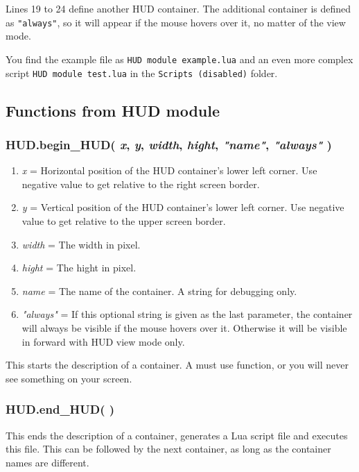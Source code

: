 \documentclass[11pt,parskip=half,a4paper]{scrartcl}
\begin{document}
Lines 19 to 24 define another HUD container. The additional container is defined as \verb|"always"|, so it will appear if the mouse hovers over it, no matter of the view mode.

You find the example file as \verb|HUD module example.lua| and an even more complex script \verb|HUD module test.lua| in the \verb|Scripts (disabled)| folder.

\subsection{Functions from HUD module}

\subsubsection{HUD.begin\_HUD( \emph{x}, \emph{y}, \emph{width}, \emph{hight}, \emph{"name"}, \emph{"always"} )}

\begin{enumerate}
	\item \emph{x} = Horizontal position of the HUD container's lower left corner. Use negative value to get relative to the right screen border.
	\item \emph{y} = Vertical position of the HUD container's lower left corner. Use negative value to get relative to the upper screen border.
	\item \emph{width} = The width in pixel.
	\item \emph{hight} = The hight in pixel.
	\item \emph{name} = The name of the container. A string for debugging only.
	\item \emph{"always"} = If this optional string is given as the last parameter, the container will always be visible if the mouse hovers over it. Otherwise it will be visible in forward with HUD view mode only.
\end{enumerate}

This starts the description of a container. A must use function, or you will never see something on your screen.

\subsubsection{HUD.end\_HUD( )}

This ends the description of a container, generates a Lua script file and executes this file. This can be followed by the next container, as long as the container names are different.
\end{document}
